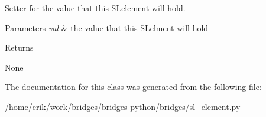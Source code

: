 Setter for the value that this \hyperlink{classbridges_1_1sl__element_1_1_s_lelement}{S\+Lelement} will hold. 


\begin{DoxyParams}{Parameters}
{\em val} & the value that this S\+Lelment will hold \\
\hline
\end{DoxyParams}
\begin{DoxyReturn}{Returns}


None 
\end{DoxyReturn}


The documentation for this class was generated from the following file\+:\begin{DoxyCompactItemize}
\item 
/home/erik/work/bridges/bridges-\/python/bridges/\hyperlink{sl__element_8py}{sl\+\_\+element.\+py}\end{DoxyCompactItemize}
